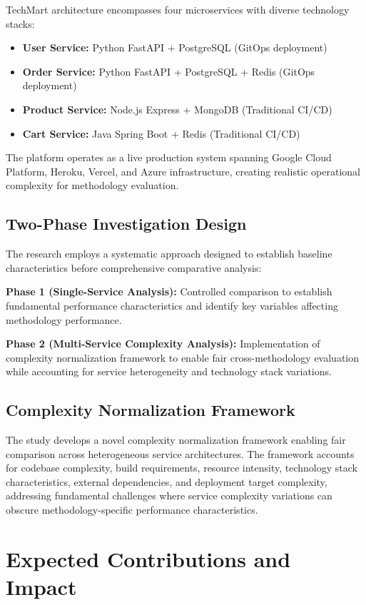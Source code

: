 TechMart architecture encompasses four microservices with diverse technology stacks:
\begin{itemize}
\item \textbf{User Service:} Python FastAPI + PostgreSQL (GitOps deployment)
\item \textbf{Order Service:} Python FastAPI + PostgreSQL + Redis (GitOps deployment)
\item \textbf{Product Service:} Node.js Express + MongoDB (Traditional CI/CD)
\item \textbf{Cart Service:} Java Spring Boot + Redis (Traditional CI/CD)
\end{itemize}

The platform operates as a live production system spanning Google Cloud Platform, Heroku, Vercel, and Azure infrastructure, creating realistic operational complexity for methodology evaluation.

\subsection{Two-Phase Investigation Design}
The research employs a systematic approach designed to establish baseline characteristics before comprehensive comparative analysis:

\textbf{Phase 1 (Single-Service Analysis):} Controlled comparison to establish fundamental performance characteristics and identify key variables affecting methodology performance.

\textbf{Phase 2 (Multi-Service Complexity Analysis):} Implementation of complexity normalization framework to enable fair cross-methodology evaluation while accounting for service heterogeneity and technology stack variations.

\subsection{Complexity Normalization Framework}
The study develops a novel complexity normalization framework enabling fair comparison across heterogeneous service architectures. The framework accounts for codebase complexity, build requirements, resource intensity, technology stack characteristics, external dependencies, and deployment target complexity, addressing fundamental challenges where service complexity variations can obscure methodology-specific performance characteristics.

\section{Expected Contributions and Impact}

